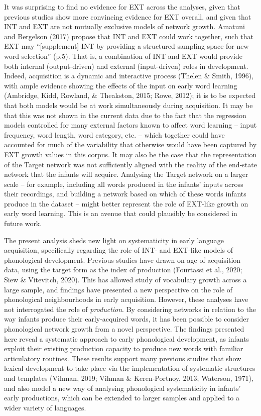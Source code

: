 \documentclass[
  man]{apa6}
\begin{document}
It was surprising to find no evidence for EXT across the analyses, given that previous studies show more convincing evidence for EXT overall, and given that INT and EXT are not mutually exclusive models of network growth. Amatuni and Bergelson (2017) propose that INT and EXT could work together, such that EXT may ``{[}supplement{]} INT by providing a structured sampling space for new word selection'' (p.5). That is, a combination of INT and EXT would provide both internal (output-driven) and external (input-driven) roles in development. Indeed, acquisition is a dynamic and interactive process (Thelen \& Smith, 1996), with ample evidence showing the effects of the input on early word learning (Ambridge, Kidd, Rowland, \& Theakston, 2015; Rowe, 2012); it is to be expected that both models would be at work simultaneously during acquisition. It may be that this was not shown in the current data due to the fact that the regression models controlled for many external factors known to affect word learning -- input frequency, word length, word category, etc. -- which together could have accounted for much of the variability that otherwise would have been captured by EXT growth values in this corpus. It may also be the case that the representation of the Target network was not sufficiently aligned with the reality of the end-state network that the infants will acquire. Analysing the Target network on a larger scale -- for example, including all words produced in the infants' inputs across their recordings, and building a network based on which of these words infants produce in the dataset -- might better represent the role of EXT-like growth on early word learning. This is an avenue that could plausibly be considered in future work.

The present analysis sheds new light on systematicity in early language acquisition, specifically regarding the role of INT- and EXT-like models of phonological development. Previous studies have drawn on age of acquisition data, using the target form as the index of production (Fourtassi et al., 2020; Siew \& Vitevitch, 2020). This has allowed study of vocabulary growth across a large sample, and findings have presented a new perspective on the role of phonological neighbourhoods in early acquisition. However, these analyses have not interrogated the role of \emph{production}. By considering networks in relation to the way infants produce their early-acquired words, it has been possible to consider phonological network growth from a novel perspective. The findings presented here reveal a systematic approach to early phonological development, as infants exploit their existing production capacity to produce new words with familiar articulatory routines. These results support many previous studies that show lexical development to take place via the implementation of systematic structures and templates (Vihman, 2019; Vihman \& Keren-Portnoy, 2013; Waterson, 1971), and also model a new way of analysing phonological systematicity in infants' early productions, which can be extended to larger samples and applied to a wider variety of languages.
\end{document}
